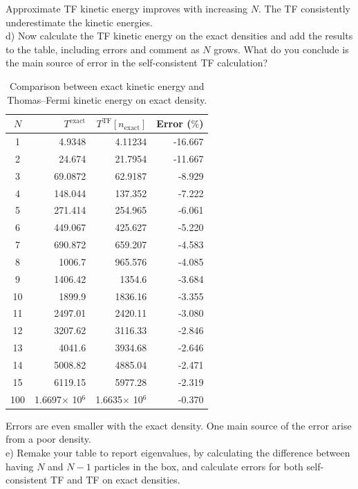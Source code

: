 \documentclass{article}
\begin{document}
{\color{blue} Approximate TF kinetic energy improves with increasing $N$. The
  TF consistently underestimate the kinetic energies.
}
\\

\noindent d) Now calculate the TF kinetic energy on the exact densities and
add the results to the table, including errors and comment as $N$ grows.
What do you conclude is the main  source of error in the self-consistent
TF calculation?

\begin{table}[H]
  \caption{Comparison between exact kinetic energy and Thomas--Fermi
    kinetic energy on exact density.}
  \centering
  \begin{tabular}{crrr}
    $N$ & $T^{\text{exact}}$ & $T^{\text{TF}}[n_{\text{exact}}]$ & Error ($\%$) \\
    \hline
   1& 4.9348& 4.11234& -16.667 \\
   2& 24.674& 21.7954& -11.667 \\
   3& 69.0872& 62.9187& -8.929 \\
   4& 148.044& 137.352& -7.222 \\
   5& 271.414& 254.965& -6.061 \\
   6& 449.067& 425.627& -5.220 \\
   7& 690.872& 659.207& -4.583 \\
   8& 1006.7& 965.576& -4.085 \\
   9& 1406.42& 1354.6& -3.684 \\
   10& 1899.9& 1836.16& -3.355 \\
   11& 2497.01& 2420.11& -3.080 \\
   12& 3207.62& 3116.33& -2.846 \\
   13& 4041.6& 3934.68& -2.646 \\
   14& 5008.82& 4885.04& -2.471 \\
   15& 6119.15& 5977.28& -2.319 \\
  100& 1.6697$\times$ 10$^6$ & 1.6635$\times$ 10$^6$& -0.370
  \end{tabular}
\end{table}

{\color{blue} Errors are even smaller with the exact density. One main source
  of the error arise from a poor density.
}
\\

\noindent e) Remake your table to report eigenvalues, by calculating the
difference between having $N$ and $N-1$ particles in the box, and calculate
errors for both self-consistent TF and TF on exact densities.
\end{document}
